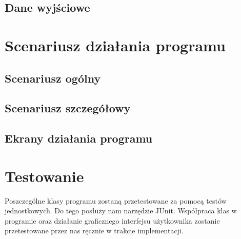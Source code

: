 \documentclass[]{article}
\begin{document}
\subsection{Dane wyjściowe} %


\section{Scenariusz działania programu}
\subsection{Scenariusz ogólny} %
\subsection{Scenariusz szczegółowy} %
\subsection{Ekrany działania programu} %


\section{Testowanie}
Poszczególne klasy programu zostaną przetestowane za pomocą testów jednostkowych. Do tego posłuży nam narzędzie JUnit. Współpraca klas w programie oraz działanie graficznego interfejsu użytkownika zostanie przetestowane przez nas ręcznie w trakcie implementacji.
\end{document}
